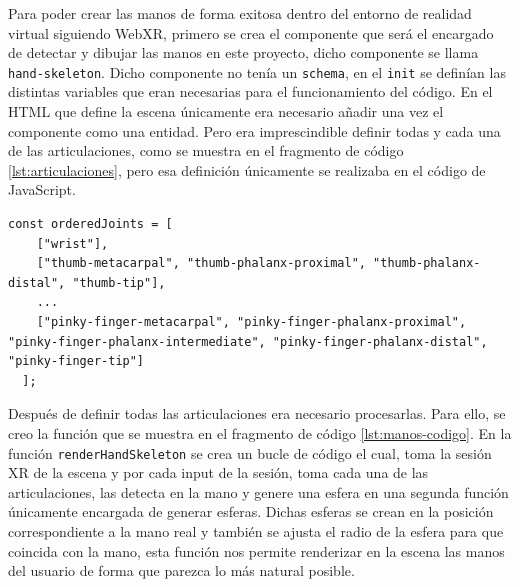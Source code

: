 \documentclass[a4paper, 12pt]{book}
\begin{document}
Para poder crear las manos de forma exitosa dentro del entorno de realidad virtual siguiendo WebXR, primero se crea el componente que será el encargado de detectar y dibujar las manos en este proyecto, dicho componente se llama \texttt{hand-skeleton}. Dicho componente no tenía un \texttt{schema}, en el \texttt{init} se definían las distintas variables que eran necesarias para el funcionamiento del código. 
En el HTML que define la escena únicamente era necesario añadir una vez el componente como una entidad. Pero era imprescindible definir todas y cada una de las articulaciones, como se muestra en el fragmento de código \ref{lst:articulaciones}, pero esa definición únicamente se realizaba en el código de JavaScript.
\begin{lstlisting}[caption=Definición de articulaciones, captionpos=b, label=lst:articulaciones]
  const orderedJoints = [
    ["wrist"],
    ["thumb-metacarpal", "thumb-phalanx-proximal", "thumb-phalanx-distal", "thumb-tip"],
    ...
    ["pinky-finger-metacarpal", "pinky-finger-phalanx-proximal", "pinky-finger-phalanx-intermediate", "pinky-finger-phalanx-distal", "pinky-finger-tip"]
  ];
\end{lstlisting}
Después de definir todas las articulaciones era necesario procesarlas. 
Para ello, se creo la función que se muestra en el fragmento de código \ref{lst:manos-codigo}. En la función \texttt{renderHandSkeleton} se crea un bucle de código el cual, toma la sesión XR de la escena y por cada input de la sesión, toma cada una de las articulaciones, las detecta en la mano y genere una esfera en una segunda función únicamente encargada de generar esferas. Dichas esferas se crean en la posición correspondiente a la mano real
y también se ajusta el radio de la esfera para que coincida con la mano, esta función nos permite renderizar en la escena las manos del usuario de forma que parezca lo más natural posible. 
\end{document}
